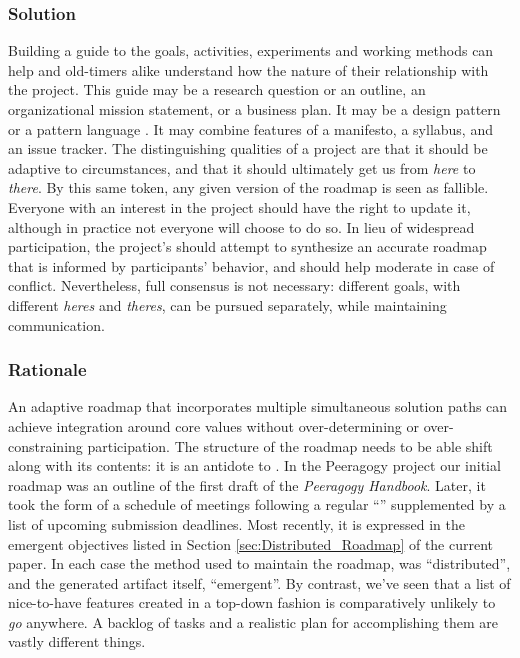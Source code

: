 \subsubsection*{Solution} Building a guide to the goals, activities, experiments and working methods can help  and old-timers alike understand how the nature of their relationship with the project.  This guide may be a research question or an outline, an organizational mission statement, or a business plan.  It may be a design pattern or a pattern language \cite{kohls2010structure}.  It may combine features of a manifesto, a syllabus, and an issue tracker.  The distinguishing qualities of a project  are that it should be adaptive to circumstances, and that it should ultimately get us from \emph{here} to \emph{there}.  By this same token, any given version of the roadmap is seen as fallible.  Everyone with an interest in the project should have the right to update it, although in practice not everyone will choose to do so.  In lieu of widespread participation, the project's  should attempt to synthesize an accurate roadmap that is informed by participants' behavior, and should help moderate in case of conflict.  Nevertheless, full consensus is not necessary: different goals, with different \emph{heres} and \emph{theres}, can be pursued separately, while maintaining communication.

\subsubsection*{Rationale} 
An adaptive roadmap that incorporates multiple simultaneous solution
paths can achieve integration around core values without
over-determining or over-constraining participation.  The structure of
the roadmap needs to be able shift along with its contents: it is an
antidote to 
\cite[pp. 121--124]{david2001software}.  In the Peeragogy project our
initial roadmap was an outline of the first draft of the
\emph{Peeragogy Handbook}.  Later, it took the form of a schedule of
meetings following a regular ``'' supplemented
by a list of upcoming submission deadlines.  Most recently, it is
expressed in the emergent objectives listed in Section
\ref{sec:Distributed_Roadmap} of the current paper.  In each case the
method used to maintain the roadmap, was ``distributed'', and the
generated artifact itself, ``emergent''.  By contrast, we've seen that
a list of nice-to-have features created in a top-down fashion is
comparatively unlikely to \emph{go} anywhere.  A backlog of tasks and
a realistic plan for accomplishing them are vastly different things.

